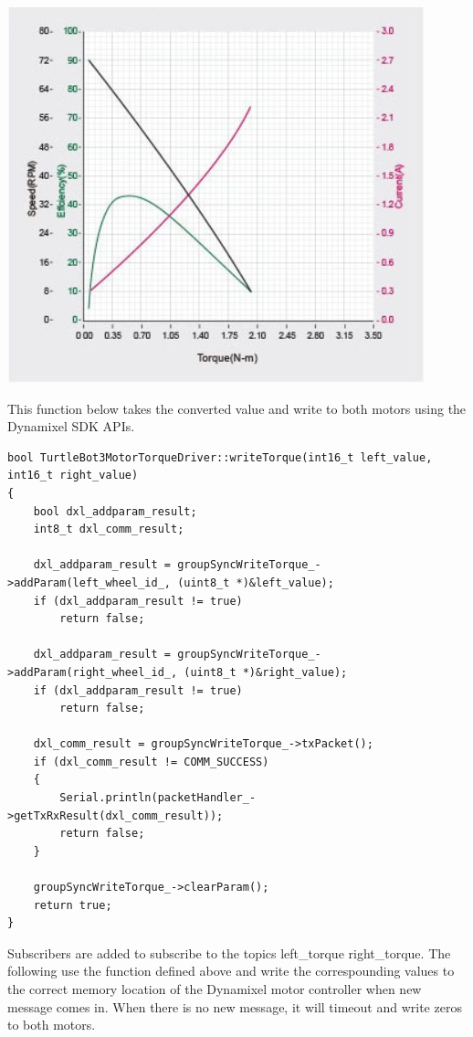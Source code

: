 \documentclass[12]{article}
\begin{document}
\begin{center}
	\includegraphics[width=\linewidth]{images/xm430_performance.png}\\
\end{center}

This function below takes the converted value and write to both motors using the Dynamixel SDK APIs. 

\begin{lstlisting}
bool TurtleBot3MotorTorqueDriver::writeTorque(int16_t left_value, int16_t right_value)
{
    bool dxl_addparam_result;
    int8_t dxl_comm_result;

    dxl_addparam_result = groupSyncWriteTorque_->addParam(left_wheel_id_, (uint8_t *)&left_value);
    if (dxl_addparam_result != true)
        return false;

    dxl_addparam_result = groupSyncWriteTorque_->addParam(right_wheel_id_, (uint8_t *)&right_value);
    if (dxl_addparam_result != true)
        return false;

    dxl_comm_result = groupSyncWriteTorque_->txPacket();
    if (dxl_comm_result != COMM_SUCCESS)
    {
        Serial.println(packetHandler_->getTxRxResult(dxl_comm_result));
        return false;
    }

    groupSyncWriteTorque_->clearParam();
    return true;
}
\end{lstlisting}

Subscribers are added to subscribe to the topics \/left\_torque \/right\_torque. 
The following use the function defined above and write the correspounding values to the correct memory location of the Dynamixel motor controller when new message comes in. When there is no new message, it will timeout and write zeros to both motors. 
\end{document}

